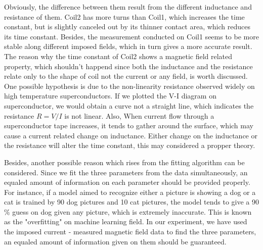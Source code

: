 Obviously, the difference between them result from the different inductance and resistance of them.
Coil2 has more turns than Coil1, which increases the time constant, but is slightly canceled out by its thinner contact area,
which reduces its time constant.
Besides, the measurement conducted on Coil1 seems to be more stable along different imposed fields,
which in turn gives a more accurate result.
The reason why the time constant of Coil2 shows a magnetic field related property,
which shouldn't happend since both the inductance and the resistance relate only to the shape of coil not the current or any field,
is worth discussed.
One possible hypothesis is due to the non-linearity resistance observed widely on high temperature superconductors.
If we plotted the V-I diagram on superconductor, we would obtain a curve not a straight line,
which indicates the resistance $R = V/I$ is not linear.
Also, When current flow through a superconductor tape increases,
it tends to gather around the surface, which may cause a current related change on inductance.
Either change on the inductance or the resistance will alter the time constant,
this may considered a propper theory.

Besides, another possible reason which rises from the fitting algorithm can be considered.
Since we fit the three parameters from the data simultaneously,
an equaled amount of information on each parameter should be provided properly.
For instance, if a model aimed to recognize either a picture is showing a dog or a cat is trained by 90 dog pictures and 10 cat pictures,
the model tends to give a 90$\%$ guess on dog given any picture,
which is extremely inaccurate.
This is known as the "overfitting" on machine learning field.
In our experiment, we have used the imposed current - measured magnetic field data to find the three parameters,
an equaled amount of information given on them should be guaranteed.

